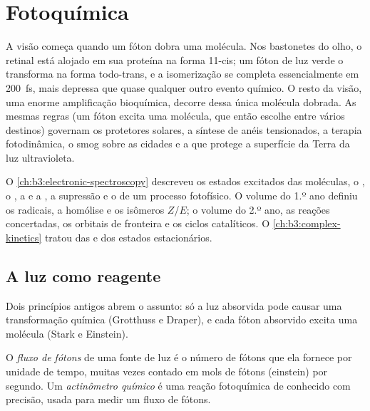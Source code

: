 \chapter{Fotoquímica}\label{ch:b3:photochemistry}

A visão começa quando um fóton dobra uma molécula. Nos bastonetes do olho, o
retinal está alojado em sua proteína na forma 11-cis; um fóton de luz verde o
transforma na forma todo-trans, e a isomerização se completa essencialmente em
\qty{200}{fs}, mais depressa que quase qualquer outro evento químico. O resto da
visão, uma enorme amplificação bioquímica, decorre dessa única molécula dobrada.
As mesmas regras (um fóton excita uma molécula, que então escolhe entre vários
destinos) governam os protetores solares, a síntese de anéis tensionados, a
terapia fotodinâmica, o smog sobre as cidades e a  que protege
a superfície da Terra da luz ultravioleta.

\begin{recall}
O \cref{ch:b3:electronic-spectroscopy} descreveu os estados excitados das
moléculas, o , o , a 
e a , a supressão e o  de um processo
fotofísico. O volume do 1.º ano definiu os radicais, a homólise e os isômeros
$Z$/$E$; o volume do 2.º ano, as reações concertadas, os orbitais de fronteira e
os ciclos catalíticos. O \cref{ch:b3:complex-kinetics} tratou das  e dos estados estacionários.
\end{recall}

\section{A luz como reagente}

Dois princípios antigos abrem o assunto: só a luz absorvida pode causar uma
transformação química (Grotthuss e Draper), e cada fóton absorvido excita uma
molécula (Stark e Einstein).

\begin{definition}\label{def:b3:photochemistry:photon-flux}
O \emph{fluxo de fótons} de uma fonte de luz é o número de
fótons que ela fornece por unidade de tempo, muitas vezes contado em mols de
fótons (einstein) por segundo. Um \emph{actinômetro químico} é
uma reação fotoquímica de  conhecido com precisão, usada para
medir um fluxo de fótons.
\end{definition}

